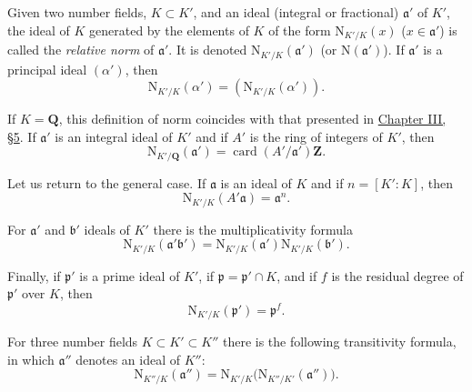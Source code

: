 
Given two number fields, $K\subset K'$, and an ideal (integral or
fractional) $\mathfrak{a}'$ of $K'$, the ideal of $K$ generated by the
elements of $K$ of the form $\mathrm{N}_{K'/K}(x)$ ($x\in\mathfrak{a}'$) is
called the \emph{relative norm} of $\mathfrak{a}'$. It is denoted
$\mathrm{N}_{K'/K}(\mathfrak{a}')$ (or $\mathrm{N}(\mathfrak{a}')$). If
$\mathfrak{a}'$ is a principal ideal $(\alpha')$, then
\begin{equation}
\mathrm{N}_{K'/K}(\alpha')=(\mathrm{N}_{K'/K}(\alpha')).
\label{eq:Supp.2}
\end{equation}

If $K=\mathbf{Q}$, this definition of norm coincides with that presented in
\hyperref[sec:3.5]{Chapter III, §5}. If $\mathfrak{a}'$ is an integral ideal of $K'$ and if $A'$
is the ring of integers of $K'$, then
\begin{equation}
\mathrm{N}_{K'/\mathbf{Q}}(\mathfrak{a}')
=\operatorname{card}(A'/\mathfrak{a}')\mathbf{Z}.
\label{eq:Supp.3}
\end{equation}

Let us return to the general case. If $\mathfrak{a}$ is an ideal of $K$ and
if $n=[K':K]$, then
\begin{equation}
\mathrm{N}_{K'/K}(A'\mathfrak{a})=\mathfrak{a}^{n}.
\label{eq:Supp.4}
\end{equation}

For $\mathfrak{a}'$ and $\mathfrak{b}'$ ideals of $K'$ there is the
multiplicativity formula
\begin{equation}
\mathrm{N}_{K'/K}(\mathfrak{a}'\mathfrak{b}')
=\mathrm{N}_{K'/K}(\mathfrak{a}')\mathrm{N}_{K'/K}(\mathfrak{b}').
\label{eq:Supp.5}
\end{equation}

Finally, if $\mathfrak{p}'$ is a prime ideal of $K'$, if
$\mathfrak{p}=\mathfrak{p}'\cap K$, and if $f$ is the residual degree of
$\mathfrak{p}'$ over $K$, then
\begin{equation}
\mathrm{N}_{K'/K}(\mathfrak{p}')=\mathfrak{p}^{f}.
\label{eq:Supp.6}
\end{equation}

For three number fields $K\subset K'\subset K''$ there is the following
transitivity formula, in which $\mathfrak{a}''$ denotes an ideal of $K''$:
\begin{equation}
\mathrm{N}_{K''/K}(\mathfrak{a}'')
=\mathrm{N}_{K'/K}\bigl(\mathrm{N}_{K''/K'}
(\mathfrak{a}'')\bigr).
\label{eq:Supp.7}
\end{equation}

